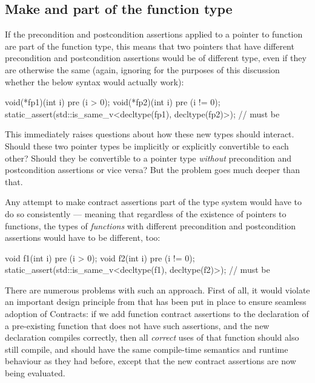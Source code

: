 \subsection{Make  and  part of the function type}

If the precondition and postcondition assertions applied to a pointer to function are part of the function type, this means that two pointers that have different precondition and postcondition assertions would be of different type, even if they are otherwise the same (again, ignoring for the purposes of this discussion whether the below syntax would actually work):
\begin{codeblock}
void(*fp1)(int i) pre (i > 0);
void(*fp2)(int i) pre (i != 0);
static_assert(std::is_same_v<decltype(fp1), decltype(fp2)>);  // must be 
\end{codeblock}
This immediately raises questions about how these new types should interact. Should these two pointer types be implicitly or explicitly convertible to each other? Should they be convertible to a pointer type \emph{without} precondition and postcondition assertions or vice versa? But the problem goes much deeper than that.

Any attempt to make contract assertions part of the type system would have to do so consistently --- meaning that regardless of the existence of pointers to functions, the types of \emph{functions} with different precondition and postcondition assertions would have to be different, too:
\begin{codeblock}
void f1(int i) pre (i > 0);
void f2(int i) pre (i != 0);
static_assert(std::is_same_v<decltype(f1), decltype(f2)>);  // must be 
\end{codeblock}
There are numerous problems with such an approach. First of all, it would violate an important design principle from \cite{P2900R7} that has been put in place to ensure seamless adoption of Contracts: if we add function contract assertions to the declaration of a pre-existing function that does not have such assertions, and the new declaration compiles correctly, then all \emph{correct} uses of that function should also still compile, and should have the same compile-time semantics and runtime behaviour as they had before, except that the new contract assertions are now being evaluated.

  
